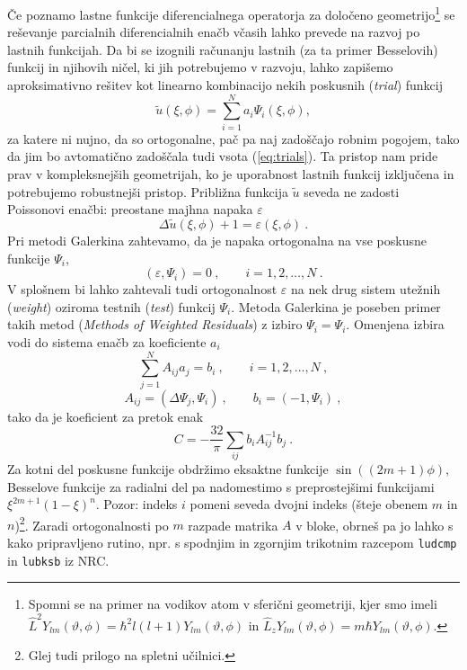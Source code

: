 \documentclass[slovene,11pt,a4paper]{article}
\def\theta{\vartheta}
\begin{document}
Če poznamo lastne funkcije diferencialnega operatorja za določeno
geometrijo\footnote{Spomni se na primer na vodikov atom v sferični geometriji,
kjer smo imeli $\widehat{L}^2 Y_{lm}(\theta,\phi) = \hbar^2 l(l+1)
Y_{lm}(\theta,\phi)$ in $\widehat{L}_z Y_{lm}(\theta,\phi) = m \hbar
Y_{lm}(\theta,\phi)$.} se reševanje parcialnih diferencialnih enačb
včasih lahko prevede na razvoj po lastnih funkcijah. Da bi se izognili
računanju lastnih (za ta primer Besselovih) funkcij in njihovih ničel,
ki jih potrebujemo v razvoju, lahko zapišemo aproksimativno
rešitev kot linearno kombinacijo nekih poskusnih ({\sl trial\/})
funkcij
\begin{equation}
\tilde{u}(\xi,\phi) = \sum\limits_{i=1}^N  a_i \Psi_i(\xi,\phi),
\label{eq:trials}
\end{equation}
za katere ni nujno, da so ortogonalne, pač pa naj zadoščajo
robnim pogojem, tako da jim bo avtomatično zadoščala tudi
vsota (\ref{eq:trials}). Ta pristop nam pride prav v kompleksnejših geometrijah,
ko je uporabnost lastnih funkcij izključena in potrebujemo robustnejši pristop.
Približna funkcija $\tilde{u}$ seveda ne zadosti Poissonovi enačbi: preostane majhna napaka $\varepsilon$
\begin{equation*}
  \Delta \tilde{u}(\xi,\phi) + 1 = \varepsilon(\xi,\phi) \>.
\end{equation*}
Pri metodi Galerkina zahtevamo, da je napaka ortogonalna
na vse poskusne funkcije $\Psi_i$,
\begin{equation*}
  (\varepsilon,\Psi_i) = 0 \>, \qquad  i = 1,2,\dots, N \>.
\end{equation*}
V splošnem bi lahko zahtevali tudi ortogonalnost $\varepsilon$
na nek drug sistem utežnih ({\sl weight\/}) oziroma testnih
({\sl test\/}) funkcij $\Psi_i$.  Metoda Galerkina je poseben
primer takih metod ({\sl Methods of Weighted Residuals\/})
z izbiro $\Psi_i = \Psi_i$.  Omenjena izbira vodi do sistema
enačb za koeficiente $a_i$
\begin{equation}
  \sum_{j=1}^N A_{ij} a_j = b_i\>, \qquad  i = 1,2,\dots, N \>,
  \label{eq:sistem}
\end{equation}
\[
A_{ij} = (\Delta \Psi_j,\Psi_i) \>, \qquad b_i = (-1,\Psi_i) \>,
\]
tako da je koeficient za pretok enak
\begin{equation*}
C =-\frac{32}{ \pi} \sum_{ij}  b_i A_{ij}^{-1} b_j \>.
\end{equation*}
Za kotni del poskusne funkcije obdržimo eksaktne funkcije
$\sin((2m+1)\phi)$, Besselove funkcije za radialni del
pa nadomestimo s preprostejšimi funkcijami $\xi^{2m+1}(1-\xi)^n$.
Pozor: indeks $i$ pomeni seveda dvojni indeks (šteje obenem
$m$ in $n$)\footnote{Glej tudi prilogo na spletni učilnici.}.  Zaradi ortogonalnosti po $m$ razpade matrika $A$ v bloke,
obrneš pa jo lahko s kako pripravljeno rutino, npr. s spodnjim
in zgornjim trikotnim razcepom {\tt ludcmp} in {\tt lubksb} iz NRC.
\end{document}
